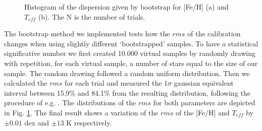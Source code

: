 \documentclass{aa}
\begin{document}
\begin{figure}[h]
\begin{center}
\end{center}
\caption{Histogram of the dispersion given by bootstrap for [Fe/H] (a) and $T_{eff}$ (b). The N is the number of trials.}
\label{fig:strap}
\end{figure}


The bootstrap method we implemented tests how the $rms$ of the calibration changes when using slightly different `bootstrapped' samples. To have a statistical significative number we first created 10.000 virtual samples by randomly drawing with repetition, for each virtual sample, a number of stars equal to the size of our sample. The random drawing followed a random uniform distribution. Then we calculated the $rms$ for each trial and measured the $1\sigma$ gaussian equivalent interval between 15.9\% and 84.1\% from the resulting distribution, following the procedure of e.g. \citet{Burgasser-2003,Neves-2013}. The distributions of the $rms$ for both parameters are depicted in Fig. \ref{fig:strap}. The final result shows a variation of the $rms$ of the [Fe/H] and $T_{eff}$ by  $\pm 0.01$ dex and $\pm 13$ K respectively.
\end{document}
